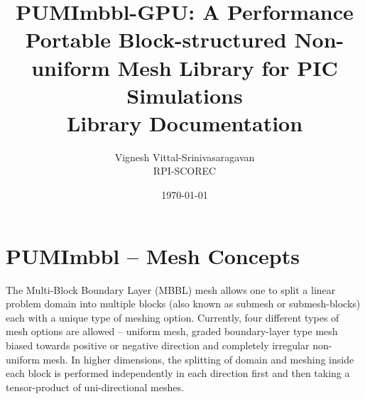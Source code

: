 \documentclass[a4paper,12pt]{article}
\title{PUMImbbl-GPU: A Performance Portable Block-structured Non-uniform Mesh Library for PIC Simulations\\{\large Library Documentation}}
\author{Vignesh Vittal-Srinivasaragavan\\RPI-SCOREC}
\date{\today}
\begin{document}
\maketitle
\newpage
\section{PUMImbbl -- Mesh Concepts}
The Multi-Block Boundary Layer (MBBL) mesh allows one to split a linear problem domain into multiple blocks (also known as submesh or submesh-blocks) each with a unique type of meshing option. Currently, four different types of mesh options are allowed -- uniform mesh, graded boundary-layer type mesh biased towards positive or negative direction and completely irregular non-uniform mesh. In higher dimensions, the splitting of domain and meshing inside each block is performed independently in each direction first and then taking a tensor-product of uni-directional meshes.
\end{document}

